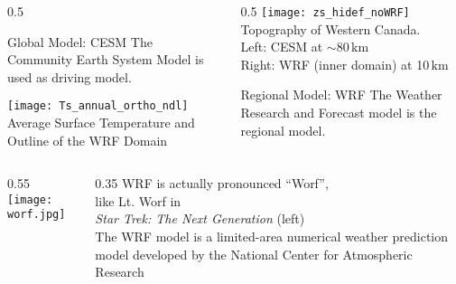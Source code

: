 \documentclass[hyperref={pdfpagelabels=false},compress,final]{beamer}
\newcommand{\km}{\ensuremath{\,\mbox{km}}}
\newenvironment{myBox}[3][shadow=true]%
{\begin{center} \begin{minipage}{#2} \begin{beamerboxesrounded}[#1]{#3} \smallskip}%
{\smallskip \end{beamerboxesrounded} \end{minipage} \end{center}}
\begin{document}
\begin{frame}{}
  \begin{columns}
    \begin{column}{0.5\textwidth}
      \small
      \begin{myBox}[shadow=true]{0.92\textwidth}{Global Model: CESM}
        \small The Community Earth System Model is used as driving model.
      \end{myBox}
      \texttt{[image: Ts\_annual\_ortho\_ndl]} \\
      {\footnotesize Average Surface Temperature and Outline of the WRF Domain}
    \end{column}
    \begin{column}{0.5\textwidth}
      \small
      \texttt{[image: zs\_hidef\_noWRF]} \\ \smallskip
      {\footnotesize Topography of Western Canada.\\
      Left: CESM at $\sim$80\km{}\\
      Right: WRF (inner domain) at 10\km{} }
      \begin{myBox}[shadow=true]{0.96\textwidth}{Regional Model: WRF}
        \small The Weather Research and Forecast model is the regional model.
      \end{myBox}
    \end{column}
  \end{columns}
\end{frame}

\begin{frame}
  \begin{columns}
    \begin{column}{0.55\textwidth}
      \texttt{[image: worf.jpg]}
    \end{column}
    \begin{column}{0.35\textwidth}
      {WRF is actually pronounced ``Worf'',\\ like Lt. Worf in \\\textit{Star Trek: The Next Generation} (left)}
      \\ \bigskip \medskip
      {\small The WRF model is a limited-area numerical weather prediction model developed by the National Center for Atmospheric Research}
    \end{column}
  \end{columns}
\end{frame}
\end{document}
